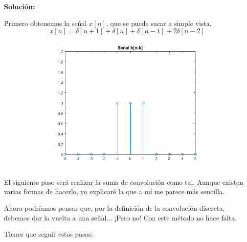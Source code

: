 \documentclass[a4paper]{book}
\begin{document}
\vspace{\parskip}
\textbf{Solución:}

Primero obtenemos la señal $x[n]$, que se puede sacar a simple vista. \[x[n] = \delta [n+1] + \delta [n] + \delta [n-1] + 2 \delta [n-2]\]

\begin{figure}[!ht]
	\caption{}
	\label{fig:Problema_2_b}
	\centering
	\begin{subfigure}[b]{0.7\linewidth}
		\includegraphics[width=\linewidth]{./Imágenes/aap.png}
	\end{subfigure}
\end{figure}

El siguiente paso será realizar la suma de convolución como tal. Aunque existen varias formas de hacerlo, yo explicaré la que a mí me parece más sencilla.

Ahora podríamos pensar que, por la definición de la convolución discreta, debemos dar la vuelta a una señal... ¡Pero no! Con este método no hace falta.

Tienes que seguir estos pasos:
\end{document}
